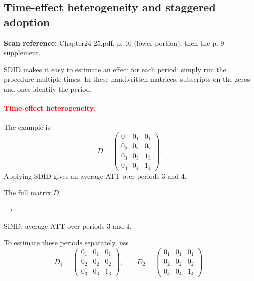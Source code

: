 \documentclass[11pt,a4paper]{article}
\newcommand{\sourcepages}[1]{\par{\small\sffamily\color{muted}\textbf{Scan reference:} #1\par}\nobreak\smallskip\nopagebreak[4]}
\newcommand{\inkred}[1]{\textcolor{red}{#1}}
\newcommand{\notearrow}[3]{%
\par\Needspace{6\baselineskip}\smallskip
\noindent\begin{minipage}[c]{0.43\linewidth}\raggedright\color{#1}#2\end{minipage}%
\hfill\textcolor{#1}{\(\longrightarrow\)}\hfill%
\begin{minipage}[c]{0.43\linewidth}\raggedright#3\end{minipage}\par\smallskip}
\begin{document}
\subsection{Time-effect heterogeneity and staggered adoption}
\sourcepages{Chapter24-25.pdf, p. 10 (lower portion), then the p. 9 supplement.}
SDID makes it easy to estimate an effect for each period: simply run the procedure multiple times. In these handwritten matrices, subscripts on the zeros and ones identify the period.
\paragraph{\inkred{Time-effect heterogeneity.}}
The example is
\[
D=\begin{pmatrix}
0_1&0_1&0_1\\0_2&0_2&0_2\\0_3&0_3&1_3\\0_4&0_4&1_4
\end{pmatrix}.
\]
Applying SDID gives an average ATT over periods 3 and 4.
\notearrow{black}{The full matrix \(D\)}{SDID: average ATT over periods 3 and 4.} To estimate these periods separately, use
\[
D_1=\begin{pmatrix}0_1&0_1&0_1\\0_2&0_2&0_2\\0_3&0_3&1_3\end{pmatrix},
\qquad
D_2=\begin{pmatrix}0_1&0_1&0_1\\0_2&0_2&0_2\\0_4&0_4&1_4\end{pmatrix}.
\]
\end{document}
